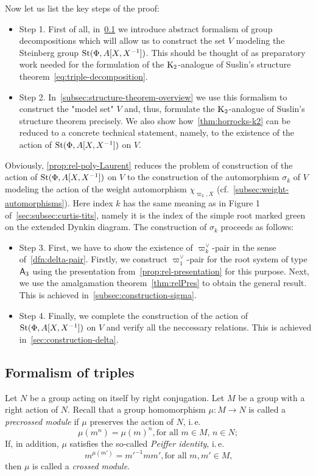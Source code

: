 Now let us list the key steps of the proof:
\begin{itemize}
    \item Step 1. First of all, in~\cref{subsec:triples} we introduce abstract formalism of group decompositions which will allow us to construct the set $V$ modeling the Steinberg group $\operatorname{St}(\Phi, A[X, X^{-1}])$.
                  This should be thought of as preparatory work needed for the formulation of the $\operatorname{K}_2$-analogue of Suslin's structure theorem~\eqref{eq:triple-decomposition}.
    \item Step 2. In~\cref{subsec:structure-theorem-overview} we use this formalism to construct the "model set" $V$ and, thus, formulate the $\operatorname{K}_2$-analogue of Suslin's structure theorem precisely.
                  We also show how~\cref{thm:horrocks-k2} can be reduced to a concrete technical statement, namely,
                  to the existence of the action of $\operatorname{St}(\Phi, A[X, X^{-1}])$ on $V$.
\end{itemize}
Obviously, \cref{prop:rel-poly-Laurent} reduces the problem of construction of the action of $\operatorname{St}(\Phi, A[X, X^{-1}])$ on $V$ to the construction of
 the automorphism $\sigma_k$ of $V$ modeling the action of the weight automorphism $\chi_{\varpi_k, X}$ (cf.~\cref{subsec:weight-automorphisms}).
Here index $k$ has the same meaning as in Figure 1 of~\cref{sec:subsec:curtis-tits}, namely it is the index of the simple root marked green on the extended Dynkin diagram.
The construction of $\sigma_k$ proceeds as follows:
\begin{itemize}
    \item Step 3. First, we have to show the existence of $\varpi_k^\vee$-pair in the sense of~\cref{dfn:delta-pair}.
                  Firstly, we construct $\varpi_1^\vee$-pair for the root system of type $\mathsf{A}_3$ using the presentation from~\cref{prop:rel-presentation} for this purpose.
                  Next, we use the amalgamation theorem~\cref{thm:relPres} to obtain the general result.
                  This is achieved in~\cref{subsec:construction-sigma}.
    \item Step 4. Finally, we complete the construction of the action of $\operatorname{St}(\Phi, A[X, X^{-1}])$ on $V$ and verify all the neccessary relations.
                  This is achieved in~\cref{sec:construction-delta}.
\end{itemize}

\subsection{Formalism of triples}\label{subsec:triples}
Let $N$ be a group acting on itself by right conjugation.
Let $M$ be a group with a right action of $N$.
Recall that a group homomorphism $\mu\colon M \to N$ is called a \textit{precrossed module} if $\mu$ preserves the action of $N$, i.\,e.
\[\mu(m^n) = \mu(m)^n, \text{for all $m \in M$, $n\in N;$} \]
If, in addition, $\mu$ satisfies the so-called \textit{Peiffer identity}, i.\,e.
\[{m}^{\mu(m')} = {m'}^{-1} m m', \text{for all $m, m' \in M$,}\]
then $\mu$ is called a \textit{crossed module}.

